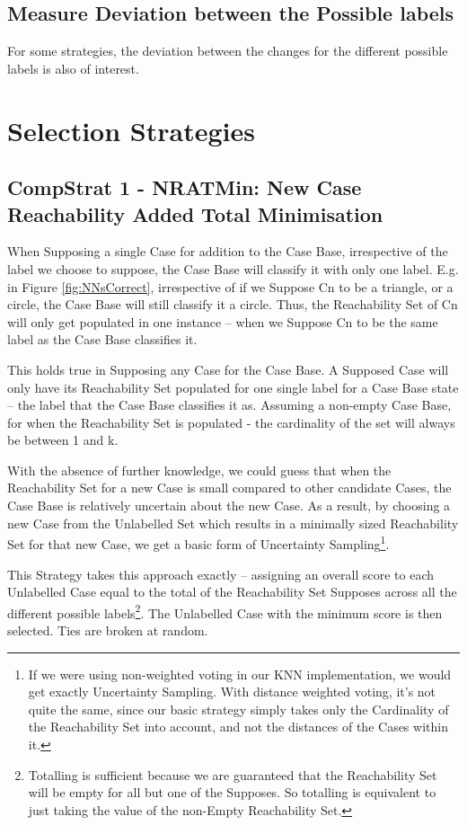 \documentclass[a4paper,11pt]{report}
\begin{document}
\subsection{Measure Deviation between the Possible labels}
For some strategies, the deviation between the changes for the different possible labels is also of interest.

\section{Selection Strategies}
\subsection{CompStrat 1 - NRATMin: New Case Reachability Added Total Minimisation\label{sec:compstrat1}}
When Supposing a single Case for addition to the Case Base, irrespective of the label we choose to suppose, the Case Base will classify it with only one label. E.g. in Figure \ref{fig:NNsCorrect}, irrespective of if we Suppose Cn to be a triangle, or a circle, the Case Base will still classify it a circle. Thus, the Reachability Set of Cn will only get populated in one instance – when we Suppose Cn to be the same label as the Case Base classifies it.

This holds true in Supposing any Case for the Case Base. A Supposed Case will only have its Reachability Set populated for one single label for a Case Base state – the label that the Case Base classifies it as. Assuming a non-empty Case Base, for when the Reachability Set is populated - the cardinality of the set will always be between 1 and k.

With the absence of further knowledge, we could guess that when the Reachability Set for a new Case is small compared to other candidate Cases, the Case Base is relatively uncertain about the new Case. As a result, by choosing a new Case from the Unlabelled Set which results in a minimally sized Reachability Set for that new Case, we get a basic form of Uncertainty Sampling\footnote{If we were using non-weighted voting in our KNN implementation, we would get exactly Uncertainty Sampling. With distance weighted voting, it's not quite the same, since our basic strategy simply takes only the Cardinality of the Reachability Set into account, and not the distances of the Cases within it.}.

This Strategy takes this approach exactly – assigning an overall score to each Unlabelled Case equal to the total of the Reachability Set Supposes across all the different possible labels\footnote{Totalling is sufficient because we are guaranteed that the Reachability Set will be empty for all but one of the Supposes. So totalling is equivalent to just taking the value of the non-Empty Reachability Set.}. The Unlabelled Case with the minimum score is then selected. Ties are broken at random.
\end{document}
